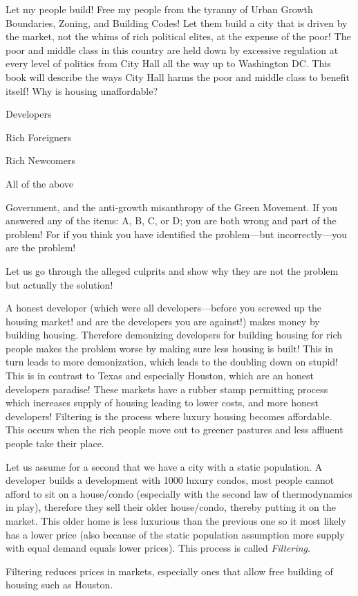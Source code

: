 \startchapter[title={Let My People Build!}]
\startsection[title={Let My People Build!}]
Let my people build!
Free my people from the tyranny of Urban Growth Boundaries, Zoning, and Building Codes!
Let them build a city that is driven by the market, not the whims of rich political elites, at the expense of the poor!
The poor and middle class in this country are held down by excessive regulation at every level of politics from  City Hall all the way up to Washington DC.
This book will describe the ways City Hall harms the poor and middle class to benefit itself!
\stopsection
\startsection[title={Why is housing unaffordable?}]
Why is housing unaffordable?
\startitemize[A]
\item Developers
\item Rich Foreigners
\item Rich Newcomers
\item All of the above
\item Government, and the anti-growth misanthropy of the Green Movement.
\stopitemize
If you answered any of the items: A, B, C, or D; you are both wrong and part of the problem!
For if you think you have identified the problem---but incorrectly---you are the problem!

Let us go through the alleged culprits and show why they are not the problem but actually the solution!

\startsection[title={The Housing Lifecycle}]
A honest developer (which were all developers---before you screwed up the housing market! and are the developers you are against!) makes money by building housing.
Therefore demonizing developers for building housing for rich people makes the problem worse by making sure less housing is built! This in turn leads to more demonization, which leads to the doubling down on stupid!
This is in contrast to Texas and especially Houston, which are an honest developers paradise!
These markets have a rubber stamp permitting process which increases supply of housing leading to lower costs, and more honest developers!
\stopsection
\startsection[title={Filtering}]
Filtering is the process where luxury housing becomes affordable.
This occurs when the rich people move out to greener pastures and less affluent people take their place.

Let us assume for a second that we have a city with a static population. A developer builds a development with 1000 luxury condos, most people cannot afford to sit on a house/condo (especially with the second law of thermodynamics in play), therefore they sell their older house/condo, thereby putting it on the market.
This older home is less luxurious than the previous one so it most likely has a lower price (also because of the static population assumption more supply with equal demand equals lower prices).
This process is called {\sl Filtering}.

Filtering reduces prices in markets, especially ones that allow free building of housing such as Houston.
\stopsection
\stopchapter
